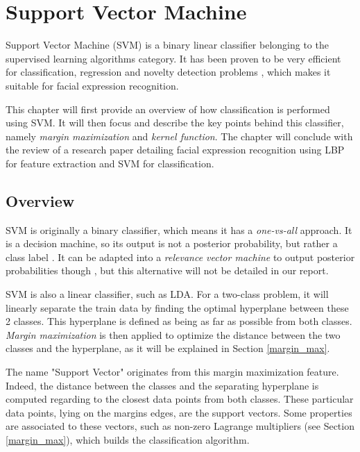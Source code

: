 \chapter{Support Vector Machine}
\label{chap:svm}

\noindent Support Vector Machine (SVM) is a binary linear classifier belonging to the supervised learning algorithms category. It has been proven to be very efficient for classification, regression and novelty detection problems \cite{BIS06}, which makes it suitable for facial expression recognition.
\newline

\noindent This chapter will first provide an overview of how classification is performed using SVM. It will then focus and describe the key points behind this classifier, namely \textit{margin maximization} and \textit{kernel function}. The chapter will conclude with the review of a research paper detailing facial expression recognition using LBP for feature extraction and SVM for classification.
\newline

\section{Overview}
\label{svm_overview}

\vspace{\baselineskip}
\noindent SVM is originally a binary classifier, which means it has a \textit{one-vs-all} approach. It is a decision machine, so its output is not a posterior probability, but rather a class label \cite{BIS06}.  It can be adapted into a \textit{relevance vector machine} to output posterior probabilities though \cite{BIS06}, but this alternative will not be detailed in our report.
\newline

\noindent SVM is also a linear classifier, such as LDA. For a two-class problem, it will linearly separate the train data by finding the optimal hyperplane between these 2 classes. This hyperplane is defined as being as far as possible from both classes. \textit{Margin maximization} is then applied to optimize the distance between the two classes and the hyperplane, as it will be explained in Section \ref{margin_max}.
\newline

\noindent The name "Support Vector" originates from this margin maximization feature. Indeed, the distance between the classes and the separating hyperplane is computed regarding to the closest data points from both classes. These particular data points, lying on the margins edges, are the support vectors. Some properties are associated to these vectors, such as non-zero Lagrange multipliers (see Section \ref{margin_max}), which builds the classification algorithm.
\newline

